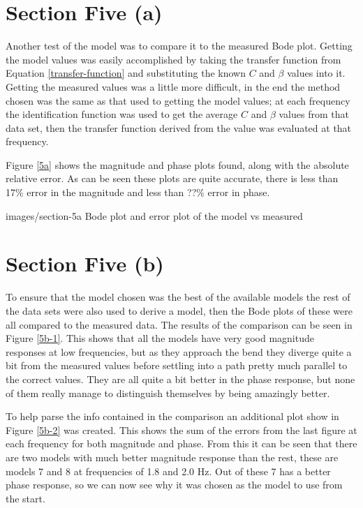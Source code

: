 \section*{Section Five (a)}

Another test of the model was to compare it to the measured Bode plot.  Getting
the model values was easily accomplished by taking the transfer function from
Equation \eqref{transfer-function} and substituting the known $C$ and $\beta$
values into it.  Getting the measured values was a little more difficult, in the
end the method chosen was the same as that used to getting the model values; at
each frequency the identification function was used to get the average $C$ and
$\beta$ values from that data set, then the transfer function derived from the
value was evaluated at that frequency.

Figure \ref{5a} shows the magnitude and phase plots found, along with the
absolute relative error.  As can be seen these plots are quite accurate, there
is less than 17\% error in the magnitude and less than ??\% error in phase.

              {images/section-5a}
              {Bode plot and error plot of the model vs measured\label{5a}}

\section*{Section Five (b)}

To ensure that the model chosen was the best of the available models the rest of
the data sets were also used to derive a model, then the Bode plots of these
were all compared to the measured data.  The results of the comparison can be
seen in Figure \ref{5b-1}.  This shows that all the models have very good
magnitude responses at low frequencies, but as they approach the bend they
diverge quite a bit from the measured values before settling into a path pretty
much parallel to the correct values.  They are all quite a bit better in the
phase response, but none of them really manage to distinguish themselves by
being amazingly better.

To help parse the info contained in the comparison an additional plot show in
Figure \ref{5b-2} was created.  This shows the sum of the errors from the last
figure at each frequency for both magnitude and phase.  From this it can be seen
that there are two models with much better magnitude response than the rest,
these are models 7 and 8 at frequencies of 1.8 and 2.0 Hz.  Out of these 7 has a
better phase response, so we can now see why it was chosen as the model to use
from the start.

